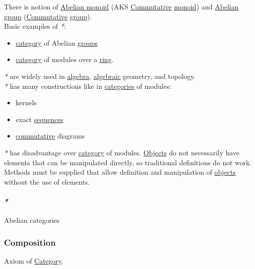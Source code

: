 \documentclass[11pt]{article}
\begin{document}
There is notion of \hyperref[org1cad511]{Abelian monoid} (AKS \hyperref[orgb53f83d]{Commutative} \hyperref[org37d140b]{monoid}) and \hyperref[org1992f6e]{Abelian group} (\hyperref[orgb53f83d]{Commutative} \hyperref[orgc937439]{group}).\\

Basic examples of \emph{*}:\\
\begin{itemize}
\item \hyperref[org0450535]{category} of Abelian \hyperref[org734e757]{groups}\\
\item \hyperref[org0450535]{category} of modules over a \hyperref[orgce31c9f]{ring}.\\
\end{itemize}

\emph{*} are widely used in \hyperref[orgecfec51]{algebra}, \hyperref[orge9081c5]{algebraic} geometry, and topology.\\

\emph{*} has many constructions like in \hyperref[org2f49b91]{categories} of modules:\\
\begin{itemize}
\item kernels\\
\item exact \hyperref[orga383401]{sequences}\\
\item \hyperref[orgb53f83d]{commutative} diagrams\\
\end{itemize}

\emph{*} has disadvantage over \hyperref[org0450535]{category} of modules. \hyperref[org363acc2]{Objects} do not necessarily have elements that can be manipulated directly, so traditional definitions do not work. Methods must be supplied that allow definition and manipulation of \hyperref[org363acc2]{objects} without the use of elements.\\

\paragraph{\emph{*}}
\label{sec:org89bb4f7}

\label{org1d568c9}Abelian categories\\

\subsubsection{\label{orga128e7f}Composition}
\label{sec:orgb3ca5f3}
Axiom of \hyperref[org0450535]{Category}.\\
\end{document}
